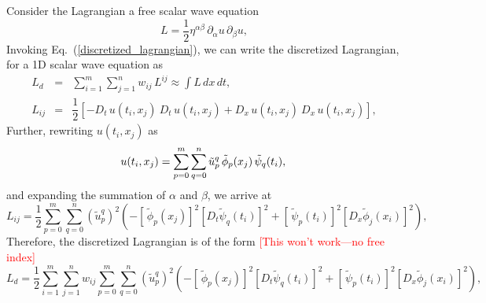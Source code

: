 \documentclass[nofootinbib,preprintnumbers,superscriptaddress,notitlepage]{revtex4-1}
\newcommand{\<}{\begin{equation}}
\newcommand{\?}{\end{equation}}
\begin{document}
Consider the Lagrangian a free scalar wave equation
\begin{equation}
L = \dfrac{1}{2} \eta^{\alpha \beta}\, \partial_{\alpha} u\, \partial_{\beta} u, 
\end{equation}
Invoking Eq.~(\ref{discretized_lagrangian}), we can write the discretized Lagrangian, for a 1D scalar wave equation as 
\begin{eqnarray}
L_d &=& \sum\limits_{i=1}^{m} \sum\limits_{j=1}^{n} w_{ij}\, L^{ij} \approx \int L\, dx\, dt,\\
L_{ij} &=& \dfrac{1}{2} \left[ - D_{t}\, u(t_i,x_j)~ D_{t}\,u(t_i,x_j) + D_{x}\, u(t_i,x_j)~ D_{x}\,u(t_i,x_j)\right],
\end{eqnarray}
Further, rewriting $u(t_i, x_j)$ as
\begin{equation}
u(t_i, x_j) = \sum\limits_{p=0}^{m}\sum\limits_{q=0}^{n}\tilde{u}_p^q \, \tilde{\phi}_p(x_j)\, \tilde{\psi}_q(t_i), \\
\end{equation}
and expanding the summation of $\alpha$ and $\beta$, we arrive at
\begin{equation}
L_{ij} = \dfrac{1}{2} \sum\limits_{p=0}^{m}\sum\limits_{q=0}^{n} (\tilde{u}_p^q)^2 \left( - \left[\, \tilde{\phi}_p(x_j)\right]^2 \left[D_t \tilde{\psi}_q(t_i)\right]^2 + \left[\, \tilde{\psi}_p(t_i)\right]^2 \left[D_x \tilde{\phi}_j(x_i)\right]^2\right),
\end{equation}
Therefore, the discretized Lagrangian is of the form \textcolor{red}{[This won't work---no free index]}
\begin{equation}
L_d = \dfrac{1}{2} \sum\limits_{i=1}^{m} \sum\limits_{j=1}^{n}  w_{ij} \sum\limits_{p=0}^{m}\sum\limits_{q=0}^{n} (\tilde{u}_p^q)^2 \left( - \left[\, \tilde{\phi}_p(x_j)\right]^2 \left[D_t \tilde{\psi}_q(t_i)\right]^2 + \left[\, \tilde{\psi}_p(t_i)\right]^2 \left[D_x \tilde{\phi}_j(x_i)\right]^2\right),
\end{equation}


\end{document}
